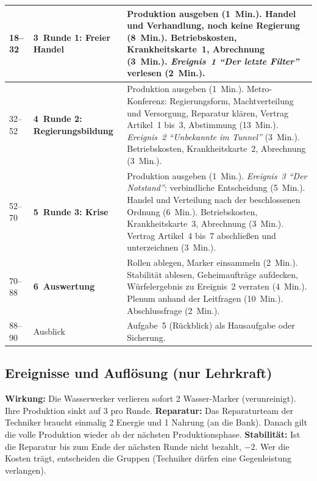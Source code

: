 \begin{center}
{\begin{longtable}{|p{1.5cm}|p{3.5cm}|p{\dimexpr\textwidth-5cm-6\tabcolsep-4\arrayrulewidth\relax}|}
18--32 & \textbf{3~Runde 1: Freier Handel} & Produktion ausgeben (1~Min.). Handel und Verhandlung, noch keine Regierung (8~Min.). Betriebskosten, Krankheitskarte~1, Abrechnung (3~Min.). \emph{Ereignis~1 \enquote{Der letzte Filter}} verlesen (2~Min.). \\ \hline
32--52 & \textbf{4~Runde 2: Regierungsbildung} & Produktion ausgeben (1~Min.). Metro-Konferenz: Regierungsform, Machtverteilung und Versorgung, Reparatur klären, Vertrag Artikel~1 bis~3, Abstimmung (13~Min.). \emph{Ereignis~2 \enquote{Unbekannte im Tunnel}} (3~Min.). Betriebskosten, Krankheitskarte~2, Abrechnung (3~Min.). \\ \hline
52--70 & \textbf{5~Runde 3: Krise} & Produktion ausgeben (1~Min.). \emph{Ereignis~3 \enquote{Der Notstand}}: verbindliche Entscheidung (5~Min.). Handel und Verteilung nach der beschlossenen Ordnung (6~Min.). Betriebskosten, Krankheitskarte~3, Abrechnung (3~Min.). Vertrag Artikel~4 bis~7 abschließen und unterzeichnen (3~Min.). \\ \hline
70--88 & \textbf{6~Auswertung} & Rollen ablegen, Marker einsammeln (2~Min.). Stabilität ablesen, Geheimaufträge aufdecken, Würfelergebnis zu Ereignis~2 verraten (4~Min.). Plenum anhand der Leitfragen (10~Min.). Abschlussfrage (2~Min.). \\ \hline
88--90 & Ausblick & Aufgabe~5 (Rückblick) als Hausaufgabe oder Sicherung. \\ \hline
\end{longtable}
\fi}
\end{center}

\subsection*{Ereignisse und Auflösung (nur Lehrkraft)}

\begin{eventbox}[title={Ereignis 1: Der letzte Filter (am Ende von Runde 1)},fonttitle=\bfseries]
\textbf{Wirkung:} Die Wasserwerker verlieren sofort 2 Wasser-Marker (verunreinigt). Ihre Produktion sinkt auf 3 pro Runde. \textbf{Reparatur:} Das Reparaturteam der Techniker braucht einmalig 2 Energie und 1 Nahrung (an die Bank). Danach gilt die volle Produktion wieder ab der nächsten Produktionsphase. \textbf{Stabilität:} Ist die Reparatur bis zum Ende der nächsten Runde nicht bezahlt, $-2$. Wer die Kosten trägt, entscheiden die Gruppen (Techniker dürfen eine Gegenleistung verlangen).
\end{eventbox}

